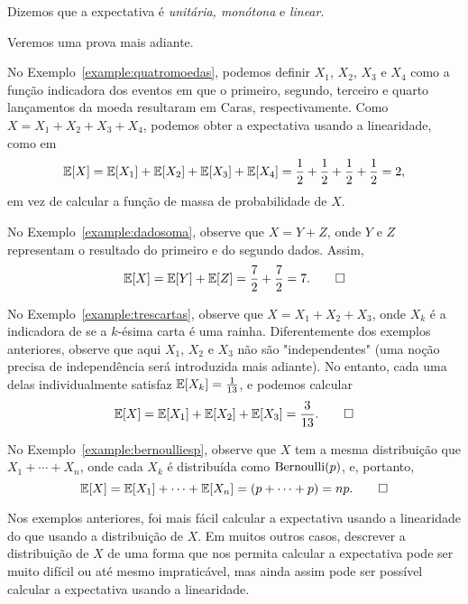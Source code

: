 Dizemos que a expectativa é \emph{unitária, monótona} e \emph{linear}.

Veremos uma prova mais adiante.

\begin{example}
No Exemplo~\ref{example:quatromoedas},
podemos definir $ X_1 $, $ X_2 $, $ X_3 $ e $ X_4 $ como a função indicadora dos eventos em que o primeiro, segundo, terceiro e quarto lançamentos da moeda resultaram em Caras, respectivamente.
Como $X = X_1 + X_2 + X_3 + X_4$, podemos obter a expectativa usando a linearidade, como em
\[
\mathbb{E} [X] = \mathbb{E} [X_1] + \mathbb{E} [X_2] + \mathbb{E} [X_3] + \mathbb{E} [X_4] = \frac{1}{2} + \frac{1}{2} + \frac{1}{2} + \frac{1}{2} = 2,
\]
em vez de calcular a função de massa de probabilidade de $ X $.
\end{example}

\begin{example}
No Exemplo~\ref{example:dadosoma}, observe que $X = Y+Z$, onde $Y$ e $Z$ representam o resultado do primeiro e do segundo dados.
Assim,
\[
\mathbb{E} [X] = \mathbb{E} [Y] + \mathbb{E} [Z] = \frac{7}{2} + \frac{7}{2} = 7.
\qedhere
\]
\end{example}

\begin{example}
No Exemplo~\ref{example:trescartas}, observe que $X = X_1 + X_2 + X_3$, onde $X_k$ é a indicadora de se a $k$-ésima carta é uma rainha.
Diferentemente dos exemplos anteriores, observe que aqui $X_1$, $X_2$ e $X_3$ não são "independentes"
(uma noção precisa de independência será introduzida mais adiante).
No entanto, cada uma delas individualmente satisfaz $\mathbb{E} [X_k] = \frac{1}{13}$, e podemos calcular
\[
\mathbb{E} [X] = \mathbb{E} [X_1] + \mathbb{E} [X_2] + \mathbb{E} [X_3] = \frac{3}{13}.
\qedhere
\]
\end{example}

\begin{example}
No Exemplo~\ref{example:bernoulliesp}, observe que $X$ tem a mesma distribuição que $X_1+\cdots+X_n$, onde cada $X_k$ é distribuída como $\mathrm{Bernoulli}(p)$, e, portanto,
\[
\mathbb{E} [X] = \mathbb{E} [X_1] + \cdots + \mathbb{E} [X_n] = (p+\cdots+p) = np.
\qedhere
\]
\end{example}

Nos exemplos anteriores, foi mais fácil calcular a expectativa usando a linearidade do que usando a distribuição de $X$. Em muitos outros casos, descrever a distribuição de $X$ de uma forma que nos permita calcular a expectativa pode ser muito difícil ou até mesmo impraticável, mas ainda assim pode ser possível calcular a expectativa usando a linearidade.

